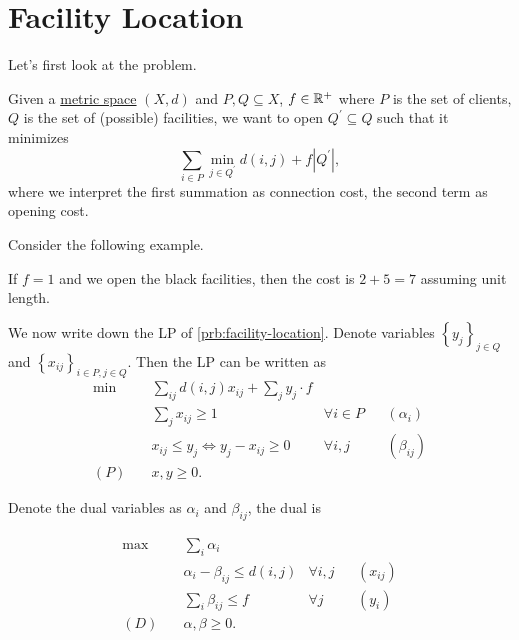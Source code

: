 \section{Facility Location}
Let's first look at the problem.

\begin{problem}\label{prb:facility-location}
Given a \hyperref[rmk:metric-space]{metric space} \((X, d)\) and \(P,  Q\subseteq X\), \(f\in \mathbb{\MakeUppercase{r}} ^+\) where \(P\) is the set of clients, \(Q\) is the set of (possible) facilities, we want to open \(Q^\prime \subseteq Q\) such that it minimizes
\[
	\sum_{i\in P} \min _{j\in Q^\prime } d(i, j) + f\left\vert Q^\prime  \right\vert,
\]
where we interpret the first summation as connection cost, the second term as opening cost.
\end{problem}

\begin{eg}
	Consider the following example.
	\begin{center}
	\end{center}
	If \(f = 1\) and we open the black facilities, then the cost is \(2 + 5 = 7\) assuming unit length.
\end{eg}

We now write down the LP of \autoref{prb:facility-location}. Denote variables \(\left\{ y_{j} \right\}_{j\in Q}\) and \(\left\{ x_{ij} \right\}_{i\in P, j\in Q}\). Then the LP can be written as
\begin{align*}
	\min~    & \sum_{ij} d(i, j) x_{ij} + \sum_{j} y_{j} \cdot f                                     \\
	         & \sum_{j}x_{ij} \geq 1                             & \forall i\in P &  & (\alpha _i)   \\
	         & x_{ij} \leq y_j \iff y_j - x_{ij} \geq 0          & \forall i, j   &  & (\beta_{ij} ) \\
	(P)\quad & x, y \geq 0.
\end{align*}

Denote the dual variables as \(\alpha _i\) and \(\beta_{ij} \), the dual is

\begin{align*}
	\max~    & \sum_{i} \alpha _i                                                 \\
	         & \alpha _i - \beta _{ij} \leq d(i, j) & \forall i, j &  & (x_{ij} ) \\
	         & \sum_{i} \beta _{ij} \leq f          & \forall j    &  & (y_i)     \\
	(D)\quad & \alpha , \beta \geq 0.
\end{align*}

